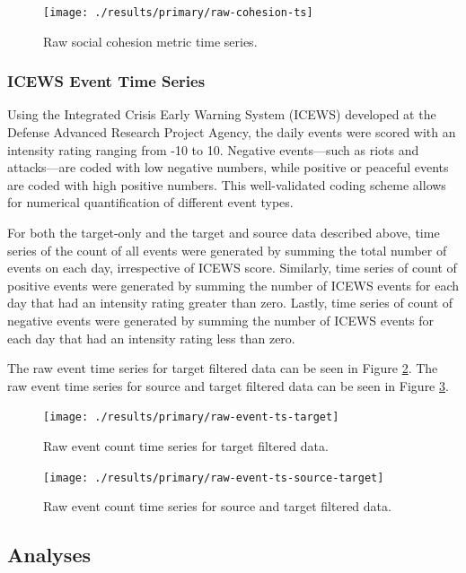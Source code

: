 \documentclass[
  english,
  man]{apa6}
\begin{document}
\begin{figure}
\texttt{[image: ./results/primary/raw-cohesion-ts]} \caption{Raw social cohesion metric time series.}\label{fig:raw-cohesion-ts}
\end{figure}

\hypertarget{icews-event-time-series}{%
\subsubsection{ICEWS Event Time Series}\label{icews-event-time-series}}

Using the Integrated Crisis Early Warning System (ICEWS) developed at the
Defense Advanced Research Project Agency, the daily events were scored with an
intensity rating ranging from -10 to 10. Negative events---such as riots and
attacks---are coded with low negative numbers, while positive or peaceful events
are coded with high positive numbers. This well-validated coding scheme allows
for numerical quantification of different event types.

For both the target-only and the target and source data described above, time
series of the count of all events were generated by summing the total number of
events on each day, irrespective of ICEWS score. Similarly, time series of count
of positive events were generated by summing the number of ICEWS events for each
day that had an intensity rating greater than zero. Lastly, time series of count
of negative events were generated by summing the number of ICEWS events for each
day that had an intensity rating less than zero.

The raw event time series for target filtered data can be seen in Figure
\ref{fig:raw-event-ts-target}. The raw event time series for source and target
filtered data can be seen in Figure \ref{fig:raw-event-ts-source-target}.

\begin{figure}
\texttt{[image: ./results/primary/raw-event-ts-target]} \caption{Raw event count time series for target filtered data.}\label{fig:raw-event-ts-target}
\end{figure}

\begin{figure}
\texttt{[image: ./results/primary/raw-event-ts-source-target]} \caption{Raw event count time series for source and target filtered data.}\label{fig:raw-event-ts-source-target}
\end{figure}

\hypertarget{analyses}{%
\subsection{Analyses}\label{analyses}}
\end{document}
